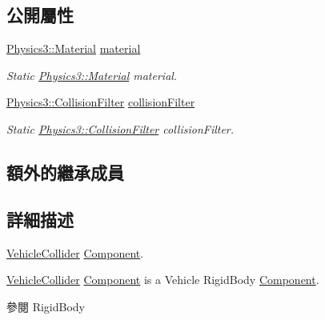\subsection*{公開屬性}
\begin{DoxyCompactItemize}
\item 
\hyperlink{class_i_dream_sky_1_1_physics3_1_1_material}{Physics3\+::\+Material} \hyperlink{class_i_dream_sky_1_1_vehicle_collider_a92d8b6893d8c8216907a4354bebfe3ee}{material}\hypertarget{class_i_dream_sky_1_1_vehicle_collider_a92d8b6893d8c8216907a4354bebfe3ee}{}\label{class_i_dream_sky_1_1_vehicle_collider_a92d8b6893d8c8216907a4354bebfe3ee}

\begin{DoxyCompactList}\small\item\em Static \hyperlink{class_i_dream_sky_1_1_physics3_1_1_material}{Physics3\+::\+Material} material. \end{DoxyCompactList}\item 
\hyperlink{class_i_dream_sky_1_1_physics3_1_1_collision_filter}{Physics3\+::\+Collision\+Filter} \hyperlink{class_i_dream_sky_1_1_vehicle_collider_a7749b1ea918bd2e3bb687737dafb90d1}{collision\+Filter}\hypertarget{class_i_dream_sky_1_1_vehicle_collider_a7749b1ea918bd2e3bb687737dafb90d1}{}\label{class_i_dream_sky_1_1_vehicle_collider_a7749b1ea918bd2e3bb687737dafb90d1}

\begin{DoxyCompactList}\small\item\em Static \hyperlink{class_i_dream_sky_1_1_physics3_1_1_collision_filter}{Physics3\+::\+Collision\+Filter} collision\+Filter. \end{DoxyCompactList}\end{DoxyCompactItemize}
\subsection*{額外的繼承成員}


\subsection{詳細描述}
\hyperlink{class_i_dream_sky_1_1_vehicle_collider}{Vehicle\+Collider} \hyperlink{class_i_dream_sky_1_1_component}{Component}. 

\hyperlink{class_i_dream_sky_1_1_vehicle_collider}{Vehicle\+Collider} \hyperlink{class_i_dream_sky_1_1_component}{Component} is a Vehicle Rigid\+Body \hyperlink{class_i_dream_sky_1_1_component}{Component}. \begin{DoxySeeAlso}{參閱}
Rigid\+Body 
\end{DoxySeeAlso}


